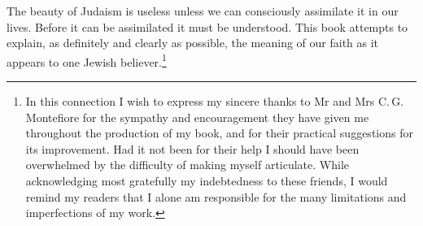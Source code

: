 The beauty of Judaism is useless unless
we can consciously assimilate it in our lives.
Before it can be assimilated it must be
understood. This book attempts to explain,
as definitely and clearly as possible, the
meaning of our faith as it appears to one
Jewish believer.\footnote{In this connection
I wish to express my sincere thanks
to Mr and Mrs C.\,G.\,Montefiore for the sympathy and
encouragement they have given me throughout the production
of my book, and for their practical suggestions for
its improvement. Had it not been for their help I should
have been overwhelmed by the difficulty of making myself
articulate. While acknowledging most gratefully my indebtedness
to these friends, I would remind my readers
that I alone am responsible for the many limitations and
imperfections of my work.}
